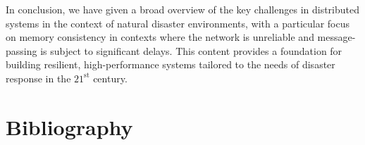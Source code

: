 \documentclass[]             %
{NASA}                       %
\theoremstyle{definition}
\begin{document}
In conclusion, we have given a broad overview of the key challenges in
distributed systems in the context of natural disaster environments,
with a particular focus on memory consistency in contexts where the
network is unreliable and message-passing is subject to significant
delays. This content provides a foundation for building resilient,
high-performance systems tailored to the needs of disaster response in
the $21^\textrm{st}$ century.

\section*{Bibliography}\label{bibliography}



\end{document}
